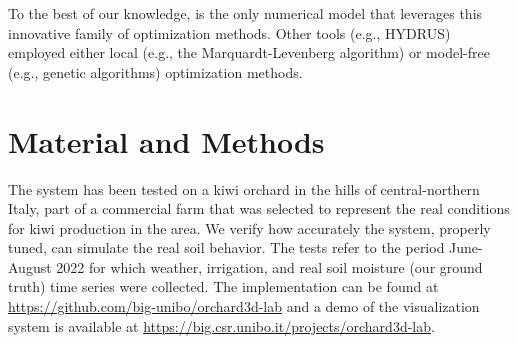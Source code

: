 To the best of our knowledge, \olab{} is the only numerical model that leverages this innovative family of optimization methods.
Other tools (e.g., HYDRUS) employed either local (e.g., the Marquardt-Levenberg algorithm) or model-free (e.g., genetic algorithms) optimization methods. 

\section{Material and Methods}
The system has been tested on a kiwi orchard in the hills of central-northern Italy, part of a commercial farm that was selected to represent the real conditions for kiwi production in the area.
We verify how accurately the system, properly tuned, can simulate the real soil behavior.
The tests refer to the period June-August 2022 for which weather, irrigation, and real soil moisture (our ground truth) time series were collected.
The implementation can be found at \url{https://github.com/big-unibo/orchard3d-lab} and a demo of the \olab{} visualization system is available at \url{https://big.csr.unibo.it/projects/orchard3d-lab}.
